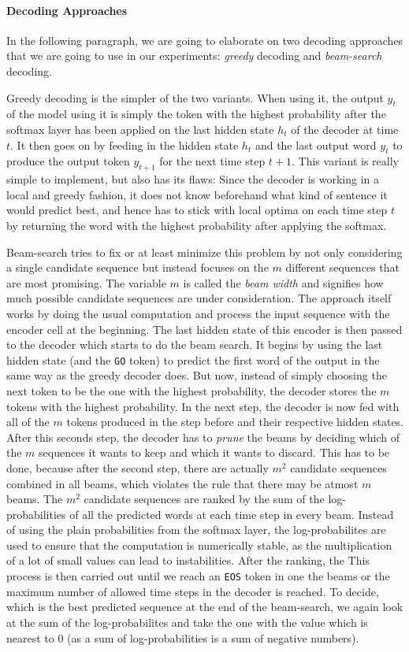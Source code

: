 \paragraph{Decoding Approaches} In the following paragraph, we are going to elaborate on two decoding approaches that we are going to use in our experiments: \emph{greedy} decoding and \emph{beam-search} decoding.

Greedy decoding is the simpler of the two variants. When using it, the output $y_t$ of the model using it is simply the token with the highest probability after the softmax layer has been applied on the last hidden state $h_t$ of the decoder at time $t$. It then goes on by feeding in the hidden state $h_t$ and the last output word $y_t$ to produce the output token $y_{t+1}$ for the next time step $t+1$. This variant is really simple to implement, but also has its flaws: Since the decoder is working in a local and greedy fashion, it does not know beforehand what kind of sentence it would predict best, and hence has to stick with local optima on each time step $t$ by returning the word with the highest probability after applying the softmax.

Beam-search tries to fix or at least minimize this problem by not only considering a single candidate sequence but instead focuses on the $m$ different sequences that are most promising. The variable $m$ is called the \emph{beam width} and signifies how much possible candidate sequences are under consideration. The approach itself works by doing the usual computation and process the input sequence with the encoder cell at the beginning. The last hidden state of this encoder is then passed to the decoder which starts to do the beam search. It begins by using the last hidden state (and the \texttt{GO} token) to predict the first word of the output in the same way as the greedy decoder does. But now, instead of simply choosing the next token to be the one with the highest probability, the decoder stores the $m$ tokens with the highest probability. In the next step, the decoder is now fed with all of the $m$ tokens produced in the step before and their respective hidden states. After this seconds step, the decoder has to \emph{prune} the beams by deciding which of the $m$ sequences it wants to keep and which it wants to discard. This has to be done, because after the second step, there are actually $m^2$ candidate sequences combined in all beams, which violates the rule that there may be atmost $m$ beams. The $m^2$ candidate sequences are ranked by the sum of the log-probabilities of all the predicted words at each time step in every beam. Instead of using the plain probabilities from the softmax layer, the log-probabilites are used to ensure that the computation is numerically stable, as the multiplication of a lot of small values can lead to instabilities. After the ranking, the  This process is then carried out until we reach an \texttt{EOS} token in one the beams or the maximum number of allowed time steps in the decoder is reached. To decide, which is the best predicted sequence at the end of the beam-search, we again look at the sum of the log-probabilites and take the one with the value which is nearest to $0$ (as a sum of log-probabilities is a sum of negative numbers).


